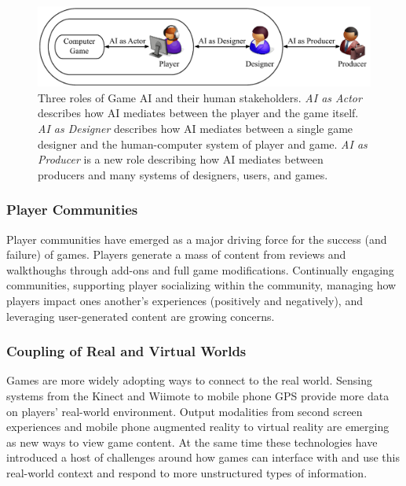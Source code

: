 \documentclass[conference]{IEEEtran}
\begin{document}
\begin{figure}
\centering
\includegraphics[scale=0.7, natwidth=100, natheight=100]{metaphor.pdf}
\caption{Three roles of Game AI and their human stakeholders.
{\em AI as Actor} describes how AI mediates between the player and the game itself. 
{\em AI as Designer} describes how AI mediates between a single game designer and the human-computer system of player and game. 
{\em AI as Producer} is a new role describing how AI mediates between producers and many systems of designers, users, and games.
}
\label{fig:metaphor}
\end{figure}

\subsubsection{Player Communities}
Player communities have emerged as a major driving force for the success (and failure) of games. 
Players generate a mass of content from reviews and walkthoughs through add-ons and full game modifications.
Continually engaging communities, supporting player socializing within the community, managing how players impact ones another's experiences (positively and negatively), and leveraging user-generated content are growing concerns.


\subsubsection{Coupling of Real and Virtual Worlds}
Games are more widely adopting ways to connect to the real world. 
Sensing systems from the Kinect and Wiimote to mobile phone GPS provide more data on players' real-world environment. 
Output modalities from second screen experiences and mobile phone augmented reality to virtual reality are emerging as new ways to view game content. 
At the same time these technologies have introduced a host of challenges around how games can interface with and use this real-world context and respond to more unstructured types of information.
\end{document}
